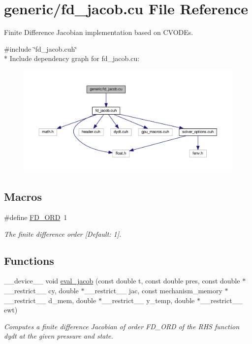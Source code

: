 \hypertarget{fd__jacob_8cu}{}\section{generic/fd\+\_\+jacob.cu File Reference}
\label{fd__jacob_8cu}


Finite Difference Jacobian implementation based on C\+V\+O\+D\+Es.  


{\ttfamily \#include \char`\"{}fd\+\_\+jacob.\+cuh\char`\"{}}\\*
Include dependency graph for fd\+\_\+jacob.\+cu\+:\nopagebreak
\begin{figure}[H]
\begin{center}
\leavevmode
\includegraphics[width=350pt]{fd__jacob_8cu__incl}
\end{center}
\end{figure}
\subsection*{Macros}
\begin{DoxyCompactItemize}
\item 
\#define \hyperlink{fd__jacob_8cu_a5c00ed5d35f84424a9e4b2197bf21ac7}{F\+D\+\_\+\+O\+RD}~1
\begin{DoxyCompactList}\small\item\em The finite difference order \mbox{[}Default\+: 1\mbox{]}. \end{DoxyCompactList}\end{DoxyCompactItemize}
\subsection*{Functions}
\begin{DoxyCompactItemize}
\item 
\+\_\+\+\_\+device\+\_\+\+\_\+ void \hyperlink{fd__jacob_8cu_ad1176739b8060ea7c37dc96b1b2d73c2}{eval\+\_\+jacob} (const double t, const double pres, const double $\ast$\+\_\+\+\_\+restrict\+\_\+\+\_\+ cy, double $\ast$\+\_\+\+\_\+restrict\+\_\+\+\_\+ jac, const mechanism\+\_\+memory $\ast$\+\_\+\+\_\+restrict\+\_\+\+\_\+ d\+\_\+mem, double $\ast$\+\_\+\+\_\+restrict\+\_\+\+\_\+ y\+\_\+temp, double $\ast$\+\_\+\+\_\+restrict\+\_\+\+\_\+ ewt)
\begin{DoxyCompactList}\small\item\em Computes a finite difference Jacobian of order F\+D\+\_\+\+O\+RD of the R\+HS function dydt at the given pressure and state. \end{DoxyCompactList}\end{DoxyCompactItemize}


